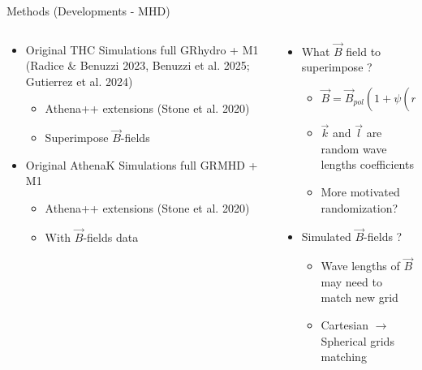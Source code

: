 ﻿\documentclass[aspectratio=169]{beamer}
\begin{document}
\begin{frame}{Methods (Developments - MHD)}
\begin{columns}

\begin{column}{0.5\textwidth}
\begin{tcolorbox}[
    colback=white,
    colframe=blue,
    colbacktitle=blue!50!black!50,
    title=GRMHD simulations,
    fonttitle=\bfseries,
    rounded corners,
    boxrule=1pt,
    left=2mm, right=2mm, top=1mm, bottom=1mm
]
\begin{itemize}   
   \scriptsize
    \item Original THC Simulations full GRhydro + M1 (Radice \& Benuzzi 2023, Benuzzi et al. 2025; Gutierrez et al. 2024)
    \begin{itemize}
    	\item Athena++ extensions (Stone et al. 2020)
    	\item Superimpose $\vec{B}$-fields
   \end{itemize}
    \item Original AthenaK Simulations full GRMHD + M1 
    \begin{itemize}
    	\item Athena++ extensions (Stone et al. 2020)
    	\item With $\vec{B}$-fields data
   \end{itemize}

\end{itemize}

\end{tcolorbox}


\end{column}

\begin{column}{0.5\textwidth}
\vspace{-0.5cm}
\begin{tcolorbox}[
    colback=white,
    colframe=blue,
    colbacktitle=blue!50!black!50,
    title=$\vec{B}$ injection,
    fonttitle=\bfseries,
    rounded corners,`
    boxrule=1pt,
    left=2mm, right=2mm, top=1mm, bottom=1mm
]

\begin{itemize}
\item What $\vec{B}$ field to superimpose ?
 	\begin{itemize}
	\item $ \vec{B} = \vec{B}_{pol}(1+\psi(r,\theta,\phi,t ,\vec{k})) + \vec{B}_{tor}(\delta(r,t, \vec{l}))$
	\item $\vec{k}$ and $\vec{l}$  are random wave lengths coefficients  
	\item More motivated randomization?
	\end{itemize}
\item Simulated $\vec{B}$-fields ?
 	\begin{itemize}
	\item Wave lengths of $\vec{B}$ may need to match new grid
	\item Cartesian $\rightarrow$ Spherical grids matching
 	\end{itemize}


\end{itemize}
\end{tcolorbox}
\end{column}
\end{columns}
\end{frame}
\end{document}
